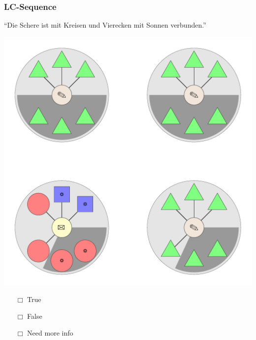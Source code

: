 \documentclass[fleqn,10pt,serif,xcolor=dvipsnames]{beamer}
\newcommand{\LC}{LC}
\newcommand{\mymark}[1]{{\color{blue}{#1}}}
\begin{document}
\begin{frame}
  \frametitle{\LC-Sequence}
  \begin{center}
    ``Die Schere ist mit Kreisen und Vierecken mit Sonnen verbunden.''

    \vspace{0.1cm}

    \includegraphics[width=0.5 \textwidth]{../../pictures/lc_01_4.pdf}

    \vspace{0.1cm}

    \begin{multicols}{3}
      \begin{itemize} 
      \item[$\Box$] True\\
        \onslide<2>{$\leadsto$  \mymark{false}}
      \item[$\Box$] False\\
        \onslide<2>{$\leadsto$ \mymark{false}}
      \item[$\Box$] Need more info 
      \end{itemize}
    \end{multicols}

  \end{center}
\end{frame}
\end{document}
